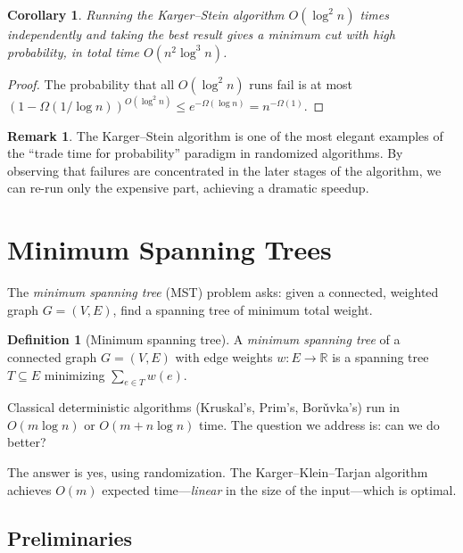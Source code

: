 \documentclass[twoside,12pt]{book}
\theoremstyle{plain}
\newtheorem{corollary}[theorem]{Corollary}
\theoremstyle{definition}
\newtheorem{definition}[theorem]{Definition}
\newtheorem{remark}[theorem]{Remark}
\theoremstyle{remark}
\begin{document}
\begin{corollary}
Running the Karger--Stein algorithm $O(\log^2 n)$ times independently and taking the best result gives a minimum cut with high probability, in total time $O(n^2 \log^3 n)$.
\end{corollary}

\begin{proof}
The probability that all $O(\log^2 n)$ runs fail is at most $(1 - \Omega(1/\log n))^{O(\log^2 n)} \leq e^{-\Omega(\log n)} = n^{-\Omega(1)}$.
\end{proof}

\begin{remark}
The Karger--Stein algorithm is one of the most elegant examples of the ``trade time for probability'' paradigm in randomized algorithms. By observing that failures are concentrated in the later stages of the algorithm, we can re-run only the expensive part, achieving a dramatic speedup.
\end{remark}



\section{Minimum Spanning Trees}
\label{sec:mst}

The \emph{minimum spanning tree} (MST) problem asks: given a connected, weighted graph $G = (V, E)$, find a spanning tree of minimum total weight.

\begin{definition}[Minimum spanning tree]
A \emph{minimum spanning tree} of a connected graph $G = (V, E)$ with edge weights $w: E \to \mathbb{R}$ is a spanning tree $T \subseteq E$ minimizing $\sum_{e \in T} w(e)$.
\end{definition}

Classical deterministic algorithms (Kruskal's, Prim's, Bor\v{u}vka's) run in $O(m \log n)$ or $O(m + n \log n)$ time. The question we address is: can we do better?

The answer is yes, using randomization. The Karger--Klein--Tarjan algorithm achieves $O(m)$ expected time---\emph{linear} in the size of the input---which is optimal.

\subsection{Preliminaries}
\end{document}
